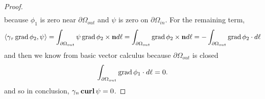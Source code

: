 \documentclass[../master_thesis.tex]{subfiles}
\begin{document}
\begin{proof}
\begin{align*}
    \end{align*}
    because $\phi_1$ is zero near $\partial \Omega_{out}$ and $\psi$ is zero on 
    $\partial \Omega_{in}$. For the remaining term, 
    \begin{align*}
        \langle \gamma_\tau \operatorname{grad} \phi_2, \psi \rangle
        = \int_{\partial\Omega_{out}} \psi \operatorname{grad} \phi_2 \times \mathbf{n}d\ell 
        = \int_{\partial\Omega_{out}} \operatorname{grad} \phi_2 \times \mathbf{n} d\ell 
        = - \int_{\partial\Omega_{out}} \operatorname{grad} \phi_2 \cdot d\ell
    \end{align*}
    and then we know from basic vector calculus because $\partial\Omega_{out}$ is closed
    \begin{align*}
        \int_{\partial\Omega_{out}} \operatorname{grad} \phi_1 \cdot d\ell = 0.
    \end{align*}
    and so in conclusion, $\gamma_n \veccurl \psi = 0$.
\end{proof}
\end{document}
